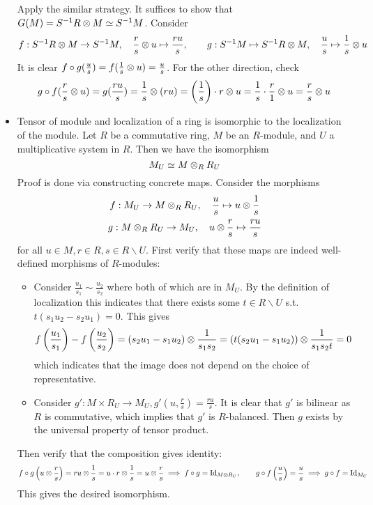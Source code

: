 \begin{example}
\begin{itemize}
        Apply the similar strategy. It suffices to show that $G(M) = S^{-1}R \otimes M \simeq S^{-1}M$. Consider
        \[
            f: S^{-1}R \otimes M \to S^{-1}M, \quad \frac{r}{s} \otimes u \mapsto \frac{ru}{s}, \qquad g: S^{-1}M \mapsto S^{-1}R \otimes M, \quad \frac{u}{s} \mapsto \frac{1}{s} \otimes u
        \]
        It is clear $f \circ g(\frac{u}{s}) = f(\frac{1}{s} \otimes u) = \frac{u}{s}$. For the other direction, check
        \[
            g \circ f (\frac{r}{s} \otimes u) = g(\frac{ru}{s}) = \frac{1}{s} \otimes (ru) = \left(\frac{1}{s}\right)\cdot r \otimes u = \frac{1}{s} \cdot \frac{r}{1} \otimes u = \frac{r}{s} \otimes u
        \]
        \item Tensor of module and localization of a ring is isomorphic to the localization of the module. Let $R$ be a commutative ring, $M$ be an $R$-module, and $U$ a multiplicative system in $R$. Then we have the isomorphism
        \[
            M_U \simeq M \otimes_R R_U
        \]
        Proof is done via constructing concrete maps. Consider the morphisms
        \[
            \begin{array}{c}
                f: M_U \to M \otimes_R R_U, \quad \dfrac{u}{s} \mapsto u \otimes \dfrac{1}{s} \\[8pt]
                g: M \otimes_R R_U \to M_U, \quad u \otimes \dfrac{r}{s} \mapsto \dfrac{ru}{s}
            \end{array}
        \]
        for all $u \in M, r \in R, s \in R\smallsetminus U$. First verify that these maps are indeed well-defined morphisms of $R$-modules:
        \begin{itemize}
            \item Consider $\frac{u_1}{s_1} \sim \frac{u_2}{s_2}$ where both of which are in $M_U$. By the definition of localization this indicates that there exists some $t \in R \smallsetminus U$ s.t. $t(s_1 u_2 - s_2 u_1) = 0$. This gives
            \[
                f\left( \frac{u_1}{s_1} \right) - f\left( \frac{u_2}{s_2} \right) = (s_2 u_1 - s_1 u_2) \otimes \frac{1}{s_1 s_2} = (t(s_2 u_1 - s_1 u_2)) \otimes \frac{1}{s_1 s_2 t} = 0
            \]
            which indicates that the image does not depend on the choice of representative.
            \item Consider $g': M \times R_U \to M_U, g'(u, \frac{r}{s}) = \frac{ru}{s}$. It is clear that $g'$ is bilinear as $R$ is commutative, which implies that $g'$ is $R$-balanced. Then $g$ exists by the universal property of tensor product.
        \end{itemize} 
        Then verify that the composition gives identity:
        \[
            f \circ g \left(u \otimes \frac{r}{s}\right) = ru \otimes \frac{1}{s} = u \cdot r \otimes \frac{1}{s} = u \otimes \frac{r}{s} \implies f \circ g = \mathrm{Id}_{M \otimes R_U}, \qquad
            g \circ f \left(\frac{u}{s}\right) = \frac{u}{s} \implies g \circ f = \mathrm{Id}_{M_U}
        \]
        This gives the desired isomorphism.
    \end{itemize}
\end{example}

